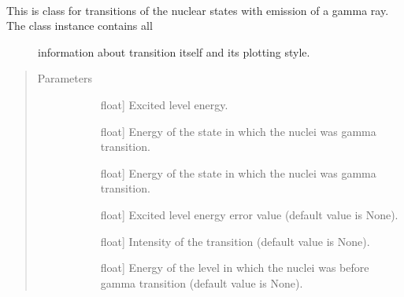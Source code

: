 \documentclass[letterpaper,10pt,english]{sphinxmanual}
\begin{document}
\begin{fulllineitems}
\label{\detokenize{nice_scheme_plotter:database_reader.Transition}}~\begin{description}
\item[{This is class for transitions of the nuclear states with emission of a gamma ray. The class instance contains all}] \leavevmode
information about transition itself and its plotting style.

\end{description}
\begin{quote}\begin{description}
\item[{Parameters}] \leavevmode\begin{description}
\item[{}] \leavevmode{[}float{]}
Excited level energy.

\item[{}] \leavevmode{[}float{]}
Energy of the state in which the nuclei was  gamma transition.

\item[{}] \leavevmode{[}float{]}
Energy of the state in which the nuclei was  gamma transition.

\item[{}] \leavevmode{[}float{]}
Excited level energy error value (default value is None).

\item[{}] \leavevmode{[}float{]}
Intensity of the transition (default value is None).

\item[{}] \leavevmode{[}float{]}
Energy of the level in which the nuclei was before gamma transition (default value is None).

\end{description}


\end{description}
\end{quote}
\end{fulllineitems}
\end{document}
